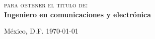 \begin{center}
\begin{minipage}{0.52\textwidth}
\begin{flushright}


\end{flushright}																	%
\end{minipage}	
\vspace*{1cm}

\begin{center}	

\textsc{\LARGE para obtener el titulo de:}\\[.5cm]		

 		\large{\textbf{\Large Ingeniero en comunicaciones y electrónica}	}\ %
\vspace{.5cm} 																				
																				
{\large México, D.F. \monthyeardate \today }	%
 			\end{center}\end{center}		
 			 			\vspace{.1cm} 	
																		
